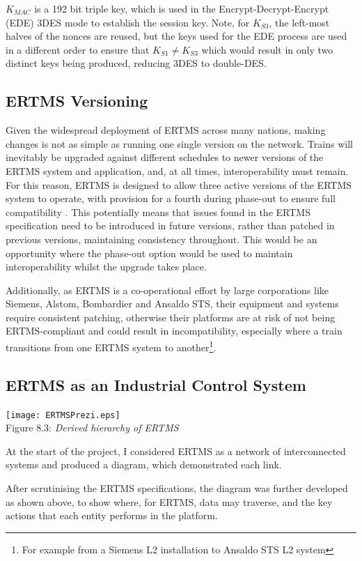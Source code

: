 \documentclass[twoside,11pt,a4paper]{article}
\begin{document}
$K_{MAC}$ is a 192 bit triple key, which is used in the Encrypt-Decrypt-Encrypt (EDE) 3DES mode to establish the session key. Note, for $K_{S3}$, the left-most halves of the nonces are reused, but the keys used for the EDE process are used in a different order to ensure that $K_{S1} \neq K_{S3}$ which would result in only two distinct keys being produced, reducing 3DES to double-DES.

\subsection{ERTMS Versioning}
Given the widespread deployment of ERTMS across many nations, making changes is not as simple as running one single version on the network. Trains will inevitably be upgraded against different schedules to newer versions of the ERTMS system and application, and, at all times, interoperability must remain. For this reason, ERTMS is designed to allow three active versions of the ERTMS system to operate, with provision for a fourth during phase-out to ensure full compatibility \citep{SUBSET-104}. This potentially means that issues found in the ERTMS specification need to be introduced in future versions, rather than patched in previous versions, maintaining consistency throughout. This would be an opportunity where the phase-out option would be used to maintain interoperability whilst the upgrade takes place.

Additionally, as ERTMS is a co-operational effort by large corporations like Siemens, Alstom, Bombardier and Ansaldo STS, their equipment and systems require consistent patching, otherwise their platforms are at risk of not being ERTMS-compliant and could result in incompatibility, especially where a train transitions from one ERTMS system to another\footnote{For example from a Siemens L2 installation to Ansaldo STS L2 system}.

\subsection{ERTMS as an Industrial Control System}
\begin{center}
 \texttt{[image: ERTMSPrezi.eps]}\\
Figure 8.3: \textit{Derived hierarchy of ERTMS}
\end{center}
At the start of the project, I considered ERTMS as a network of interconnected systems and produced a diagram, which demonstrated each link.

After scrutinising the ERTMS specifications, the diagram was further developed as shown above, to show where, for ERTMS, data may traverse, and the key actions that each entity performs in the platform.
\end{document}
